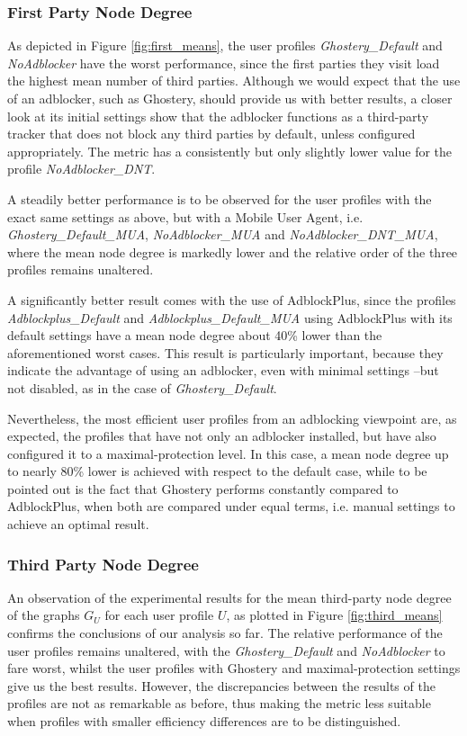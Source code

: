 \documentclass{sig-alternate}
\begin{document}
\subsubsection{First Party Node Degree}
{\color{blue}As depicted in Figure \ref{fig:first_means}, the user profiles \textit{Ghostery\_Default} and \textit{NoAdblocker} have the worst performance, since the first parties they visit load the highest mean number of third parties. Although we would expect that the use of an adblocker, such as Ghostery, should provide us with better results, a closer look at its initial settings show that the adblocker functions as a third-party tracker that does not block any third parties by default, unless configured appropriately. The metric has a consistently but only slightly lower value for the profile \textit{NoAdblocker\_DNT}.

A steadily better performance is to be observed for the user profiles with the exact same settings as above, but with a Mobile User Agent, i.e. \textit{Ghostery\_Default\_MUA}, \textit{NoAdblocker\_MUA} and \textit{NoAdblocker\_DNT\_MUA}, where the mean node degree is markedly lower and the relative order of the three profiles remains unaltered.

A significantly better result comes with the use of AdblockPlus, since the profiles \textit{Adblockplus\_Default} and \textit{Adblockplus\_Default\_MUA} using AdblockPlus with its default settings have a mean node degree about 40\% lower than the aforementioned worst cases. This result is particularly important, because they indicate the advantage of using an adblocker, even with minimal settings --but not disabled, as in the case of \textit{Ghostery\_Default}.

Nevertheless, the most efficient user profiles from an adblocking viewpoint are, as expected, the profiles that have not only an adblocker installed, but have also configured it to a maximal-protection level. In this case, a mean node degree up to nearly 80\% lower is achieved with respect to the default case, while to be pointed out is the fact that Ghostery performs constantly compared to AdblockPlus, when both are compared under equal terms, i.e. manual settings to achieve an optimal result.}

\subsubsection{Third Party Node Degree}
{\color{blue}An observation of the experimental results for the mean third-party node degree of the graphs $G_U$ for each user profile $U$, as plotted in Figure \ref{fig:third_means} confirms the conclusions of our analysis so far. The relative performance of the user profiles remains unaltered, with the \textit{Ghostery\_Default} and \textit{NoAdblocker} to fare worst, whilst the user profiles with Ghostery and maximal-protection settings give us the best results. However, the discrepancies between the results of the profiles are not as remarkable as before, thus making the metric less suitable when profiles with smaller efficiency differences are to be distinguished.}
\end{document}
